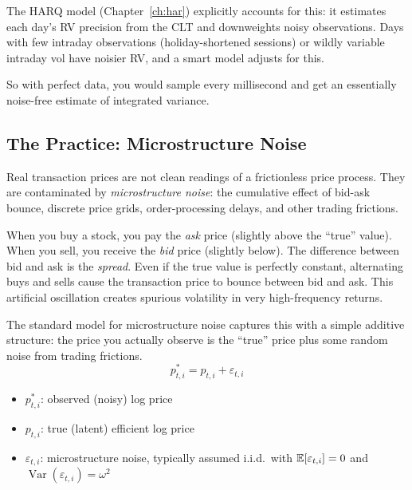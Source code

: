 \begin{projectconnection}
The HARQ model (Chapter~\ref{ch:har}) explicitly accounts for this: it estimates each day's RV precision from the CLT and downweights noisy observations.
Days with few intraday observations (holiday-shortened sessions) or wildly variable intraday vol have noisier RV, and a smart model adjusts for this.
\end{projectconnection}

So with perfect data, you would sample every millisecond and get an essentially noise-free estimate of integrated variance.

\subsection{The Practice: Microstructure Noise}

Real transaction prices are not clean readings of a frictionless price process.
They are contaminated by \emph{microstructure noise}: the cumulative effect of bid-ask bounce, discrete price grids, order-processing delays, and other trading frictions.

\begin{prereq}
When you buy a stock, you pay the \emph{ask} price (slightly above the ``true'' value).
When you sell, you receive the \emph{bid} price (slightly below).
The difference between bid and ask is the \emph{spread}.
Even if the true value is perfectly constant, alternating buys and sells cause the transaction price to bounce between bid and ask.
This artificial oscillation creates spurious volatility in very high-frequency returns.
\end{prereq}

The standard model for microstructure noise \citep{ABDL2001, BNS2002} captures this with a simple additive structure:
the price you actually observe is the ``true'' price plus some random noise from trading frictions.
\begin{equation}
  p^*_{t,i} = p_{t,i} + \varepsilon_{t,i}
  \label{eq:noise-model}
\end{equation}
\begin{itemize}[nosep]
  \item $p^*_{t,i}$: observed (noisy) log price
  \item $p_{t,i}$: true (latent) efficient log price
  \item $\varepsilon_{t,i}$: microstructure noise, typically assumed i.i.d.\ with $\mathbb{E}[\varepsilon_{t,i}] = 0$ and $\operatorname{Var}(\varepsilon_{t,i}) = \omega^2$
\end{itemize}

